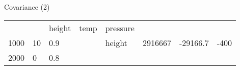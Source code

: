 \documentclass[compress]{beamer}
\begin{document}
\begin{frame}{Covariance (2)}
\begin{longtable}[c]{@{}llllllll@{}}
\begin{minipage}[t]{0.10\columnwidth}
\strut\end{minipage} &
\begin{minipage}[t]{0.10\columnwidth}\raggedright\strut
~
\strut\end{minipage} &
\begin{minipage}[t]{0.10\columnwidth}\raggedright\strut
height
\strut\end{minipage} &
\begin{minipage}[t]{0.10\columnwidth}\raggedright\strut
temp
\strut\end{minipage} &
\begin{minipage}[t]{0.10\columnwidth}\raggedright\strut
pressure
\strut\end{minipage}\tabularnewline
\begin{minipage}[t]{0.10\columnwidth}\raggedright\strut
1000
\strut\end{minipage} &
\begin{minipage}[t]{0.10\columnwidth}\raggedright\strut
10
\strut\end{minipage} &
\begin{minipage}[t]{0.10\columnwidth}\raggedright\strut
0.9
\strut\end{minipage} &
\begin{minipage}[t]{0.10\columnwidth}\raggedright\strut
\strut\end{minipage} &
\begin{minipage}[t]{0.10\columnwidth}\raggedright\strut
height
\strut\end{minipage} &
\begin{minipage}[t]{0.10\columnwidth}\raggedright\strut
2916667
\strut\end{minipage} &
\begin{minipage}[t]{0.10\columnwidth}\raggedright\strut
-29166.7
\strut\end{minipage} &
\begin{minipage}[t]{0.10\columnwidth}\raggedright\strut
-400
\strut\end{minipage}\tabularnewline
\begin{minipage}[t]{0.10\columnwidth}\raggedright\strut
2000
\strut\end{minipage} &
\begin{minipage}[t]{0.10\columnwidth}\raggedright\strut
0
\strut\end{minipage} &
\begin{minipage}[t]{0.10\columnwidth}\raggedright\strut
0.8
\strut\end{minipage} &
\begin{minipage}[t]{0.10\columnwidth}\raggedright\strut

\end{minipage}
\end{longtable}
\end{frame}
\end{document}
